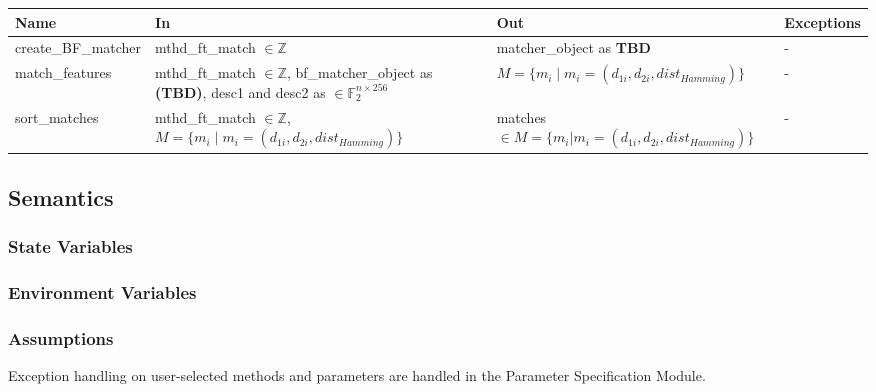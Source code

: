\documentclass[12pt, titlepage]{article}
\begin{document}
\begin{center}
\begin{tabular}{p{3.5cm} p{4cm} p{3.5cm} p{2.5cm}}
\hline
\textbf{Name} & \textbf{In} & \textbf{Out} & \textbf{Exceptions} \\
\hline
create\_BF\_matcher & mthd\_ft\_match $\in \mathbb{Z}$ 
& matcher\_object as \textbf{TBD}& - \\
\hline
match\_features & mthd\_ft\_match $\in \mathbb{Z}$, \newline
bf\_matcher\_object as \textbf{(TBD)}, \newline
desc1 and desc2 as $\in \mathbb{F}_{2}^{n\times 256}$ 
& $M = \{ m_i \mid m_i = (d_{1i}, d_{2i}, 
dist_{Hamming})\}$ & - \\
\hline
sort\_matches & mthd\_ft\_match $\in \mathbb{Z}$, \newline 
$M = \{ m_i \mid m_i = (d_{1i}, d_{2i}, dist_{Hamming})\}$ & 
matches $\in M = \{m_i | m_i = (d_{1i}, d_{2i}, dist_{Hamming})\}$ 
& - \\
\hline
\end{tabular}
\end{center}

\subsection{Semantics}

\subsubsection{State Variables}


\subsubsection{Environment Variables}


\subsubsection{Assumptions}

Exception handling on user-selected methods and parameters are handled in the Parameter 
Specification Module.
\end{document}
